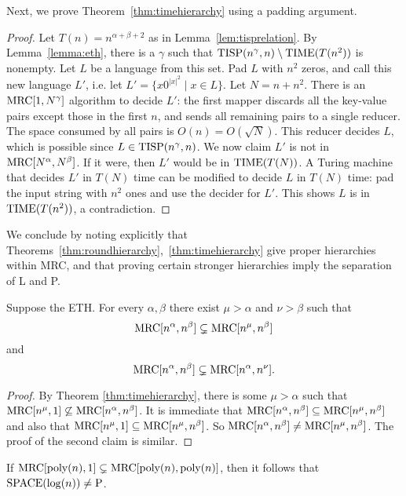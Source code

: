 \documentclass{llncs}
\newcommand{\mrc}{\textup{MRC}}
\newcommand{\TIME}{\textup{TIME}}
\newcommand{\TISP}{\textup{TISP}}
\renewcommand{\P}{\textup{P}}
\renewcommand{\L}{\textup{SPACE}(\log(n))}
\begin{document}
Next, we prove Theorem~\ref{thm:timehierarchy} using a padding argument.

\begin{proof}
Let $T(n) = n^{\alpha + \beta + 2}$ as in Lemma~\ref{lem:tisprelation}. By
Lemma~\ref{lemma:eth}, there is a $\gamma$ such that $\TISP(n^\gamma,
n)\setminus\TIME(T(n^{2}))$ is nonempty.  Let $L$ be a language from this set.
Pad $L$ with $n^{2}$ zeros, and call this new language $L'$, i.e. let $L' = \{x
0^{|x|^{2}} \mid x \in  L\}$. Let $N = n + n^{2}$. There is an $\mrc[1,
N^\gamma]$ algorithm to decide $L'$: the first mapper discards all the
key-value pairs except those in the first $n$, and sends all remaining pairs to
a single reducer. The space consumed by all pairs is $O(n) = O(\sqrt{N})$. This
reducer decides $L$, which is possible since $L \in \TISP(n^\gamma, n)$. We now
claim $L'$ is not in $\mrc[N^\alpha, N^\beta]$. If it were, then $L'$ would be
in $\TIME(T(N))$. A Turing machine that decides $L'$ in $T(N)$ time can be
modified to decide $L$ in $T(N)$ time: pad the input string with $n^{2}$ ones
and use the decider for $L'$. This shows $L$ is in $\TIME(T(n^{2}))$, a
contradiction.  \end{proof}

We conclude by noting explicitly that
Theorems~\ref{thm:roundhierarchy},~\ref{thm:timehierarchy} give proper
hierarchies within MRC, and that proving certain stronger hierarchies imply the
separation of L and P.

\begin{corollary} \label{cor:mrchierarchy}
Suppose the ETH. For every $\alpha, \beta$ there exist $\mu>\alpha$ and $\nu>\beta$
such that $$\mrc[n^\alpha, n^\beta] \subsetneq \mrc[n^\mu, n^\beta]$$ and
$$\mrc[n^\alpha, n^\beta] \subsetneq \mrc[n^\alpha, n^\nu].$$
\end{corollary}

\begin{proof}
By Theorem \ref{thm:timehierarchy}, there is some $\mu > \alpha$ such that
$\mrc[n^\mu, 1] \not\subseteq \mrc[n^\alpha, n^\beta]$.  It is immediate that
$\mrc[n^\alpha, n^\beta] \subseteq \mrc[n^\mu, n^\beta]$ and also that
$\mrc[n^\mu,1]\subseteq\mrc[n^\mu,n^\beta]$.  So $\mrc[n^\alpha,n^\beta]\neq
\mrc[n^\mu, n^\beta]$.  The proof of the second claim is similar.
\end{proof}


\begin{corollary} \label{cor:lvsp}
If $\mrc[\textup{poly}(n), 1] \subsetneq \mrc[\textup{poly}(n),
\textup{poly}(n)]$, then it follows that $\L \neq \P$.
\end{corollary}
\end{document}
